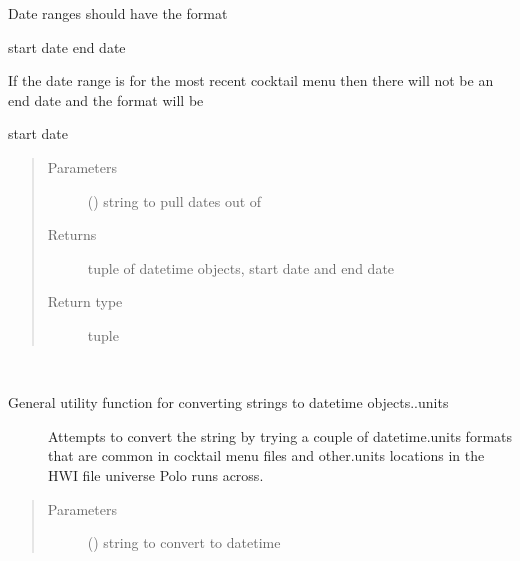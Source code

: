 \documentclass[letterpaper,10pt,english]{sphinxmanual}
\begin{document}
\begin{fulllineitems}
\begin{fulllineitems}
\begin{description}
Date ranges should have the format

start date \sphinxhyphen{} end date

If the date range is for the most recent cocktail menu then there
will not be an end date and the format will be

start date \sphinxhyphen{}

\end{description}
\begin{quote}\begin{description}
\item[{Parameters}] \leavevmode
{} () \textendash{} string to pull dates out of

\item[{Returns}] \leavevmode
tuple of datetime objects, start date and end date

\item[{Return type}] \leavevmode
tuple

\end{description}\end{quote}

\end{fulllineitems}


\begin{fulllineitems}
\label{\detokenize{polo.utils:polo.utils.io_utils.BarTender.datetime_converter}}~\begin{description}
\item[{General utility function for converting strings to datetime objects..units}] \leavevmode
Attempts to convert the string by trying a couple of datetime.units
formats that are common in cocktail menu files and other.units
locations in the HWI file universe Polo runs across.

\end{description}
\begin{quote}\begin{description}
\item[{Parameters}] \leavevmode
{} () \textendash{} string to convert to datetime


\end{description}
\end{quote}
\end{fulllineitems}
\end{fulllineitems}
\end{document}
